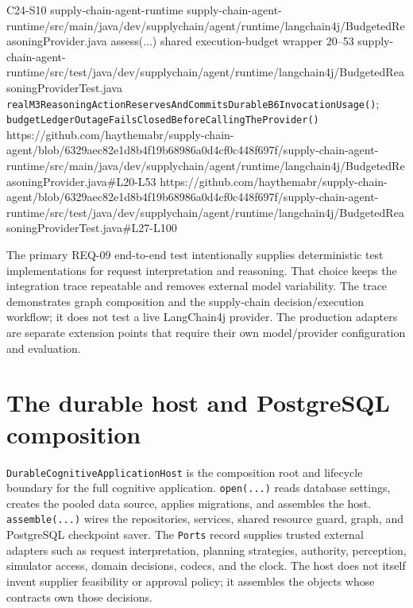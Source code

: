\BookSourceReferenceNoQR
  {C24-S10}
  {supply-chain-agent-runtime}
  {supply-chain-agent-runtime/src/main/java/dev/supplychain/agent/runtime/langchain4j/BudgetedReasoningProvider.java}
  {assess(...) shared execution-budget wrapper}
  {20--53}
  {supply-chain-agent-runtime/src/test/java/dev/supplychain/agent/runtime/langchain4j/BudgetedReasoningProviderTest.java}
  {\texttt{realM3ReasoningActionReservesAndCommitsDurableB6InvocationUsage()}; \texttt{budgetLedgerOutageFailsClosedBeforeCallingTheProvider()}}
  {https://github.com/haythemabr/supply-chain-agent/blob/6329aec82e1d8b4f19b68986a0d4cf0c448f697f/supply-chain-agent-runtime/src/main/java/dev/supplychain/agent/runtime/langchain4j/BudgetedReasoningProvider.java\#L20-L53}
  {https://github.com/haythemabr/supply-chain-agent/blob/6329aec82e1d8b4f19b68986a0d4cf0c448f697f/supply-chain-agent-runtime/src/test/java/dev/supplychain/agent/runtime/langchain4j/BudgetedReasoningProviderTest.java\#L27-L100}

The primary REQ-09 end-to-end test intentionally supplies deterministic test implementations for request interpretation and reasoning. That choice keeps the integration trace repeatable and removes external model variability. The trace demonstrates graph composition and the supply-chain decision/execution workflow; it does not test a live LangChain4j provider. The production adapters are separate extension points that require their own model/provider configuration and evaluation.

\section{The durable host and PostgreSQL composition}
\label{sec:ch24-durable-host}

\texttt{DurableCognitive\allowbreak{}ApplicationHost} is the composition root and lifecycle boundary for the full cognitive application. \texttt{open(...)} reads database settings, creates the pooled data source, applies migrations, and assembles the host. \texttt{assemble(...)} wires the repositories, services, shared resource guard, graph, and PostgreSQL checkpoint saver. The \texttt{Ports} record supplies trusted external adapters such as request interpretation, planning strategies, authority, perception, simulator access, domain decisions, codecs, and the clock. The host does not itself invent supplier feasibility or approval policy; it assembles the objects whose contracts own those decisions.

